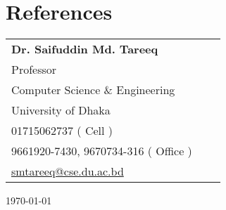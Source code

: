 \documentclass[a4paper,12pt]{article}
\begin{document}
\section{References}
\begin{table}[h]
\begin{tabular}{@{}lll@{}}
  \textbf{Dr. Saifuddin Md. Tareeq}\\
  Professor\\
Computer Science \& Engineering\\
University of Dhaka\\
\faPhone{} 01715062737 ( Cell )\\
\faPhone{} 9661920-7430, 9670734-316 ( Office )\\
\faEnvelopeO{} \href{mailto:smtareeq@cse.du.ac.bd}{smtareeq@cse.du.ac.bd}\\
\end{tabular}
\end{table}

\noindent \today
\end{document}
